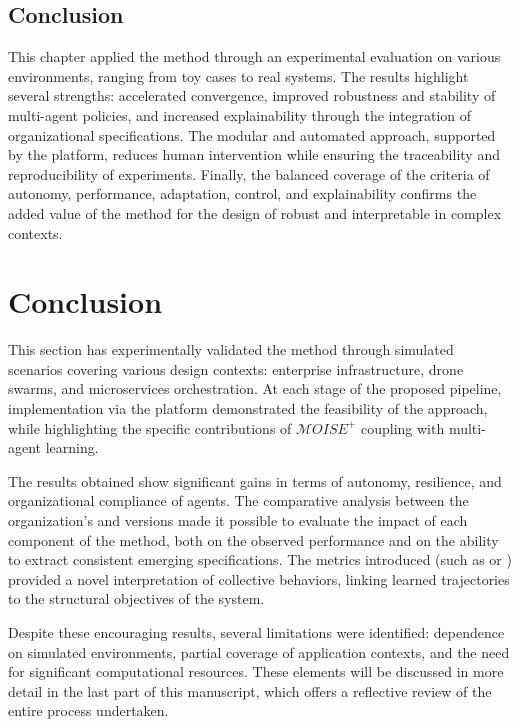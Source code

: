 \section{Conclusion}

This chapter applied the  method through an experimental evaluation on various environments, ranging from toy cases to real systems. The results highlight several strengths: accelerated convergence, improved robustness and stability of multi-agent policies, and increased explainability through the integration of organizational specifications. The modular and automated approach, supported by the  platform, reduces human intervention while ensuring the traceability and reproducibility of experiments. Finally, the balanced coverage of the criteria of autonomy, performance, adaptation, control, and explainability confirms the added value of the method for the design of robust and interpretable  in complex contexts.

\clearpage
\thispagestyle{empty}
\null
\newpage


\chapter*{Conclusion}

This section has experimentally validated the  method through simulated scenarios covering various  design contexts: enterprise infrastructure, drone swarms, and microservices orchestration. At each stage of the proposed pipeline, implementation via the  platform demonstrated the feasibility of the approach, while highlighting the specific contributions of $\mathcal{M}OISE^+$ coupling with multi-agent learning.

The results obtained show significant gains in terms of autonomy, resilience, and organizational compliance of agents. The comparative analysis between the organization's  and  versions made it possible to evaluate the impact of each component of the method, both on the observed performance and on the ability to extract consistent emerging specifications. The metrics introduced (such as  or ) provided a novel interpretation of collective behaviors, linking learned trajectories to the structural objectives of the system.

Despite these encouraging results, several limitations were identified: dependence on simulated environments, partial coverage of application contexts, and the need for significant computational resources. These elements will be discussed in more detail in the last part of this manuscript, which offers a reflective review of the entire process undertaken.

